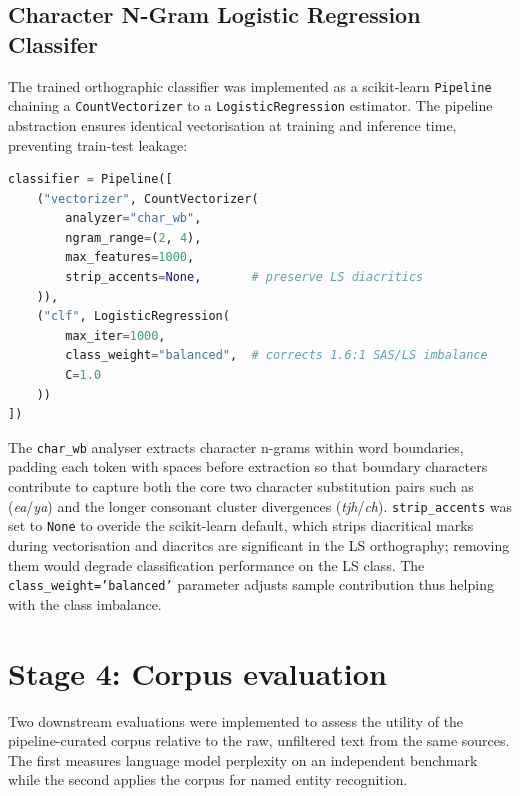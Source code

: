 \documentclass[11pt,a4paper]{article}
\begin{document}
\subsection{Character N-Gram Logistic Regression Classifer}

The trained orthographic classifier was implemented as a scikit-learn \texttt{Pipeline} chaining a \texttt{CountVectorizer} to a \texttt{LogisticRegression} estimator. The pipeline abstraction ensures identical vectorisation at training and inference time, preventing train-test leakage:

\begin{lstlisting}[language=Python, caption={Character n-gram logistic regression pipeline.}, label={lst:classifier}]
classifier = Pipeline([
    ("vectorizer", CountVectorizer(
        analyzer="char_wb",
        ngram_range=(2, 4),
        max_features=1000,
        strip_accents=None,       # preserve LS diacritics
    )),
    ("clf", LogisticRegression(
        max_iter=1000,
        class_weight="balanced",  # corrects 1.6:1 SAS/LS imbalance
        C=1.0
    ))
])
\end{lstlisting}

The \texttt{char\_wb} analyser extracts character n-grams within word boundaries, padding each token with spaces before extraction so that boundary characters contribute to capture both the core two character substitution pairs such as (\textit{ea}/\textit{ya}) and the longer consonant cluster divergences (\textit{tjh}/\textit{ch}). \texttt{strip\_accents} was set to \texttt{None} to overide the scikit-learn default, which strips diacritical marks during vectorisation and diacritcs are significant in the LS orthography; removing them would degrade classification performance on the LS class. The \texttt{class\_weight='balanced'} parameter adjusts sample contribution thus helping with the class imbalance.



\section{Stage 4: Corpus evaluation}

Two downstream evaluations were implemented to assess the utility of the pipeline-curated corpus relative to the raw, unfiltered text from the same sources. The first measures language model perplexity on an independent benchmark while the second applies the corpus for named entity recognition.
\end{document}
